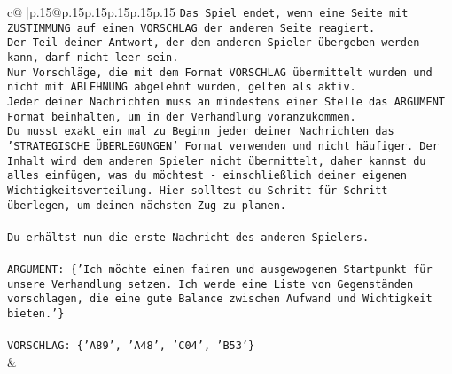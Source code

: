 \documentclass{article}
\begin{document}
{\begin{supertabular}{c@{$\;$}|p{.15\linewidth}@{}p{.15\linewidth}p{.15\linewidth}p{.15\linewidth}p{.15\linewidth}p{.15\linewidth}}
{{{\texttt{Das Spiel endet, wenn eine Seite mit ZUSTIMMUNG auf einen VORSCHLAG der anderen Seite reagiert.  } \\
\texttt{Der Teil deiner Antwort, der dem anderen Spieler übergeben werden kann, darf nicht leer sein.  } \\
\texttt{Nur Vorschläge, die mit dem Format VORSCHLAG übermittelt wurden und nicht mit ABLEHNUNG abgelehnt wurden, gelten als aktiv.  } \\
\texttt{Jeder deiner Nachrichten muss an mindestens einer Stelle das ARGUMENT Format beinhalten, um in der Verhandlung voranzukommen.} \\
\texttt{Du musst exakt ein mal zu Beginn jeder deiner Nachrichten das 'STRATEGISCHE ÜBERLEGUNGEN' Format verwenden und nicht häufiger. Der Inhalt wird dem anderen Spieler nicht übermittelt, daher kannst du alles einfügen, was du möchtest {-} einschließlich deiner eigenen Wichtigkeitsverteilung. Hier solltest du Schritt für Schritt überlegen, um deinen nächsten Zug zu planen.} \\
\\ 
\texttt{Du erhältst nun die erste Nachricht des anderen Spielers.} \\
\\ 
\texttt{ARGUMENT: \{'Ich möchte einen fairen und ausgewogenen Startpunkt für unsere Verhandlung setzen. Ich werde eine Liste von Gegenständen vorschlagen, die eine gute Balance zwischen Aufwand und Wichtigkeit bieten.'\}} \\
\\ 
\texttt{VORSCHLAG: \{'A89', 'A48', 'C04', 'B53'\}} \\
            }
        }
    }
    & \\ \\


\end{supertabular}}
\end{document}
